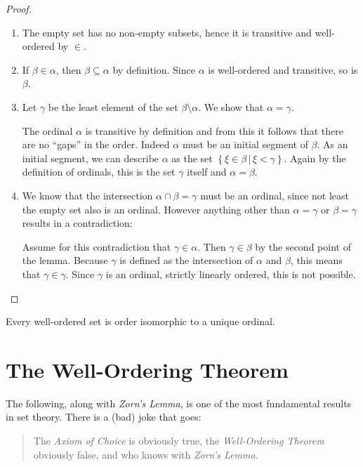 \documentclass[../../main.tex]{subfiles}
\begin{document}
\begin{proof}\cite[Lemma 2.3, p.15]{Jec78}
    \begin{enumerate}
        \item The empty set has no non-empty subsets, hence it is transitive and well-ordered by $\in$.
        \item If $\beta \in \alpha$, then $\beta \subseteq \alpha$ by definition. Since $\alpha$ is well-ordered and transitive, so is $\beta$.
        \item Let $\gamma$ be the least element of the set $\beta \setminus \alpha$. We show that $\alpha = \gamma$.
        
        The ordinal $\alpha$ is transitive by definition and from this it follows that there are no ``gaps'' in the order. Indeed $\alpha$ must be an initial segment of $\beta$.
        As an initial segment, we can describe $\alpha$ as the set $\left\{\xi \in \beta \,\vert\, \xi < \gamma\right\}$.
        Again by the definition of ordinals, this is the set $\gamma$ itself and $\alpha = \beta$.
        \item We know that the intersection $\alpha \cap \beta = \gamma$ must be an ordinal, since not least the empty set also is an ordinal.
        However anything other than $\alpha = \gamma$ or $\beta = \gamma$ results in a contradiction:
        
        Assume for this contradiction that $\gamma \in \alpha$. Then $\gamma \in \beta$ by the second point of the lemma. 
        Because $\gamma$ is defined as the intersection of $\alpha$ and $\beta$, this means that $\gamma \in \gamma$.
        Since $\gamma$ is an ordinal, strictly linearly ordered, this is not possible. \qedhere
    \end{enumerate}
\end{proof}

\begin{theorem}\label{unique-ordinal}\cite[Theorem 2, p.15]{Jec78}
    Every well-ordered set is order isomorphic to a unique ordinal.
\end{theorem}

\section{The Well-Ordering Theorem}
The following, along with \textit{Zorn's Lemma}, is one of the most fundamental results in set theory.
There is a (bad) joke that goes:
\begin{quote} %
    The \textit{Axiom of Choice} is obviously true, the \textit{Well-Ordering Theorem} obviously false, 
    and who knows with \textit{Zorn's Lemma}.
\end{quote}
\end{document}
